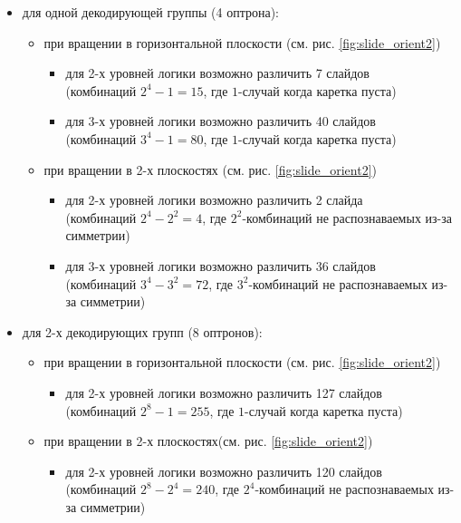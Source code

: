 \begin{itemize}
\renewcommand{\labelitemi}{$\bullet$}
\item для одной декодирующей группы (4 оптрона):
	\begin{itemize}
	\item при вращении в горизонтальной плоскости (см. рис. \ref{fig:slide_orient2})
		\begin{itemize}
			\item для 2-х уровней логики возможно различить 7 слайдов\\
			(комбинаций $2^{4}-1=15$, где $1$-случай когда каретка пуста)
			\item для 3-х уровней логики возможно различить 40 слайдов\\
			(комбинаций $3^{4}-1=80$, где $1$-случай когда каретка пуста)
		\end{itemize}
	\item при вращении в 2-х плоскостях (см. рис. \ref{fig:slide_orient2})
		\begin{itemize}
			\item для 2-х уровней логики возможно различить 2 слайда\\
			(комбинаций $2^{4}-2^{2}=4$, где $2^{2}$-комбинаций не распознаваемых из-за симметрии)
			\item для 3-х уровней логики возможно различить 36 слайдов\\
			(комбинаций $3^{4}-3^{2}=72$, где $3^{2}$-комбинаций не распознаваемых из-за симметрии)
		\end{itemize}
	\end{itemize}
\item для 2-х декодирующих групп (8 оптронов):
	\begin{itemize}
	\item при вращении в горизонтальной плоскости (см. рис. \ref{fig:slide_orient2})
		\begin{itemize}
			\item для 2-х уровней логики возможно различить 127 слайдов\\
			(комбинаций $2^{8}-1=255$, где $1$-случай когда каретка пуста)
		\end{itemize}
	\item при вращении в 2-х плоскостях(см. рис. \ref{fig:slide_orient2})
		\begin{itemize}
			\item для 2-х уровней логики возможно различить 120 слайдов\\
			(комбинаций $2^{8}-2^{4}=240$, где $2^{4}$-комбинаций не распознаваемых из-за симметрии)
		\end{itemize}
	\end{itemize}
\end{itemize}


